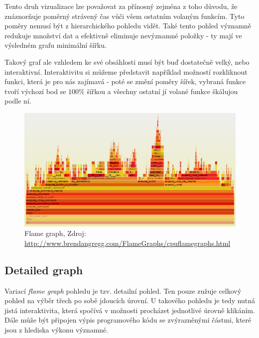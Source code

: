 \documentclass[czech,BP]{thesiskiv}
\begin{document}
Tento druh vizualizace lze považovat za přínosný zejména z toho důvodu, že znáznorňuje poměrný strávený čas vůči všem ostatním volaným funkcím. Tyto poměry nemusí být z hierarchického pohledu vidět. Také tento pohled významně redukuje množství dat a efektivně eliminuje nevýznamné položky - ty mají ve výsledném grafu minimální šířku.

Takový graf ale vzhledem ke své obsáhlosti musí být buď dostatečně velký, nebo interaktivní. Interaktivitu si můžeme představit například možností rozkliknout funkci, která je pro nás zajímavá - poté se změní poměry šířek, vybraná funkce tvoří výchozí bod se $100\%$ šířkou a všechny ostatní jí volané funkce škálujou podle ní.

\begin{figure}[h]
    \centering
    \includegraphics[interpolate,width=1.0\textwidth]{img/prof_flame.png}
    \caption{Flame graph, Zdroj: \url{http://www.brendangregg.com/FlameGraphs/cpuflamegraphs.html} }
    \label{obr:flamegr}
\end{figure}

\subsection{Detailed graph}

Variací \emph{flame graph} pohledu je tzv. detailní pohled. Ten pouze zužuje celkový pohled na výběr třech po sobě jdoucích úrovní. U takového pohledu je tedy nutná jistá interaktivita, která spočívá v možnosti procházet jednotlivé úrovně klikáním. Dále může být připojen výpis programového kódu se zvýrazněnými částmi, které jsou z hlediska výkonu významné.
\end{document}

